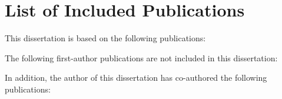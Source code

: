 \chapter{List of Included Publications}

\noindent This dissertation is based on the following publications:
\nocite{pub1Key,
        pub2Key,
        pub3Key,
        }

\printbibliography[
    heading=none,
    title={List of Included Publications},
    category=thesispapers
]


\noindent The following first-author publications are not included in this dissertation:
\nocite{pub4Key,pub5Key}
\printbibliography[
    heading=none,
    title={List of Included Publications},
    category=notincludedPapers
]


\noindent In addition, the author of this dissertation has co-authored the following publications:
\nocite{pub6Key,pub7Key}
\printbibliography[
    heading=none,
    title={List of Included Publications},
    category=additionalpapers
]

